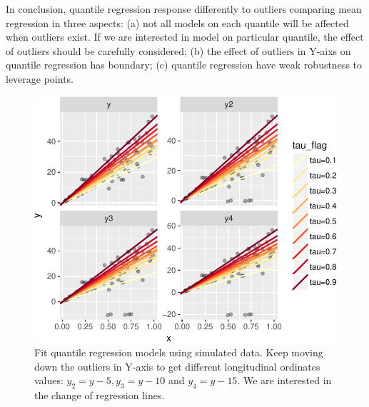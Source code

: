 \documentclass[11pt,a4paper,]{article}
\theoremstyle{definition}
\theoremstyle{definition}
\theoremstyle{remark}
\begin{document}
In conclusion, quantile regression response differently to outliers
comparing mean regression in three aspects: (a) not all models on each
quantile will be affected when outliers exist. If we are interested in
model on particular quantile, the effect of outliers should be carefully
considered; (b) the effect of outliers in Y-aixs on quantile regression
has boundary; (c) quantile regression have weak robustness to leverage
points.

\begin{figure}

{\centering \includegraphics{main_files/figure-latex/move-y1-1} 

}

\caption{Fit quantile regression models using simulated data. Keep moving down the outliers in Y-axis to get different longitudinal ordinates values: $y_{2}=y-5, y_{3}=y-10$ and $y_{4}=y-15$. We are interested in the change of regression lines.}\label{fig:move-y1}
\end{figure}
\end{document}
